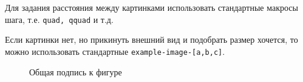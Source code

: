 Для задания расстояния между картинками использовать стандартные макросы шага, т.е. \texttt{quad, qquad} и т.д.

Если картинки нет, но прикинуть внешний вид и подобрать размер хочется, то можно использовать стандартные \texttt{example-image-[a,b,c]}.

\begin{figure}[H]
	\centering
	\captionsetup[subfigure]{justification=centering}
	\quad
	\quad
	\quad
	\caption{Общая подпись к фигуре}
\end{figure}

